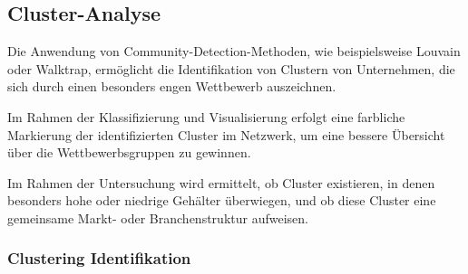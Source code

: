 \documentclass[
]{article}
\begin{document}
\subsection{Cluster-Analyse}\label{cluster-analyse}

Die Anwendung von Community-Detection-Methoden, wie beispielsweise
Louvain oder Walktrap, ermöglicht die Identifikation von Clustern von
Unternehmen, die sich durch einen besonders engen Wettbewerb
auszeichnen.

Im Rahmen der Klassifizierung und Visualisierung erfolgt eine farbliche
Markierung der identifizierten Cluster im Netzwerk, um eine bessere
Übersicht über die Wettbewerbsgruppen zu gewinnen.

Im Rahmen der Untersuchung wird ermittelt, ob Cluster existieren, in
denen besonders hohe oder niedrige Gehälter überwiegen, und ob diese
Cluster eine gemeinsame Markt- oder Branchenstruktur aufweisen.

\subsubsection{Clustering
Identifikation}\label{clustering-identifikation}
\end{document}
